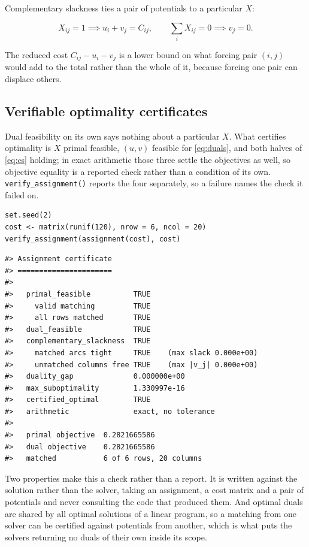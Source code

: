 Complementary slackness ties a pair of potentials to a particular \(X\):

\begin{equation}
X_{ij} = 1 \implies u_i + v_j = C_{ij} , \qquad
\textstyle\sum_{i} X_{ij} = 0 \implies v_j = 0 .
\label{eq:cs}
\end{equation}

The reduced cost \(C_{ij} - u_i - v_j\) is a lower bound on what forcing pair
\((i,j)\) would add to the total rather than the whole of it, because forcing one
pair can displace others.

\subsection{Verifiable optimality certificates}\label{verifiable-optimality-certificates}

Dual feasibility on its own says nothing about a particular \(X\). What
certifies optimality is \(X\) primal feasible, \((u, v)\) feasible for
\eqref{eq:duals}, and both halves of \eqref{eq:cs} holding; in exact arithmetic
those three settle the objectives as well, so objective equality is a reported
check rather than a condition of its own. \texttt{verify\_assignment()} reports the
four separately, so a failure names the check it failed on.

\begin{verbatim}
set.seed(2)
cost <- matrix(runif(120), nrow = 6, ncol = 20)
verify_assignment(assignment(cost), cost)
\end{verbatim}

\begin{verbatim}
#> Assignment certificate
#> ======================
#> 
#>   primal_feasible          TRUE 
#>     valid matching         TRUE 
#>     all rows matched       TRUE 
#>   dual_feasible            TRUE 
#>   complementary_slackness  TRUE 
#>     matched arcs tight     TRUE    (max slack 0.000e+00)
#>     unmatched columns free TRUE    (max |v_j| 0.000e+00)
#>   duality_gap              0.000000e+00
#>   max_suboptimality        1.330997e-16
#>   certified_optimal        TRUE 
#>   arithmetic               exact, no tolerance
#> 
#>   primal objective  0.2821665586
#>   dual objective    0.2821665586
#>   matched           6 of 6 rows, 20 columns
\end{verbatim}

Two properties make this a check rather than a report. It is written against
the solution rather than the solver, taking an assignment, a cost matrix and a
pair of potentials and never consulting the code that produced them. And
optimal duals are shared by all optimal solutions of a linear program, so a
matching from one solver can be certified against potentials from another,
which is what puts the solvers returning no duals of their own inside its
scope.


